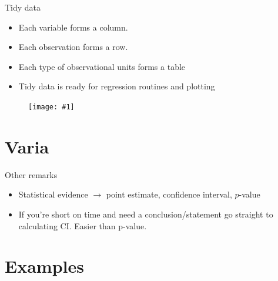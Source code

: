 \documentclass[handout]{beamer}\usepackage[]{graphicx}\usepackage[]{color}
\newcommand {\framedgraphic}[1] {
	\begin{figure}
		\centering
		\texttt{[image: \#1]}
	\end{figure}
}
\begin{document}
\begin{frame}{Tidy data}

\begin{itemize}
	\setlength\itemsep{.51em}
	\item Each variable forms a column.
	\item Each observation forms a row.
	\item Each type of observational units forms a table
	\item Tidy data is ready for regression routines and plotting
\end{itemize}


\framedgraphic{tidy.png}

\end{frame}



\section{Varia}

\begin{frame}{Other remarks}

\begin{itemize}
	\setlength\itemsep{.51em}
	\item Statistical evidence $\to$ point estimate, confidence interval, $p$-value
	\item If you're short on time and need a conclusion/statement go straight to calculating CI. Easier than p-value. 
\end{itemize}




\end{frame}


























\section{Examples}
\end{document}
